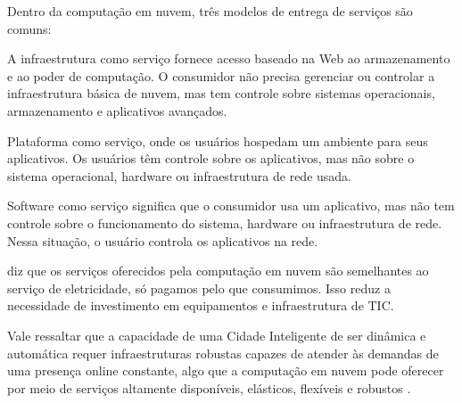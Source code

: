 Dentro da computação em nuvem, três modelos de entrega de serviços são comuns:

A infraestrutura como serviço fornece acesso baseado na Web ao armazenamento e ao poder de computação. O consumidor não precisa gerenciar ou controlar a infraestrutura básica de nuvem, mas tem controle sobre sistemas operacionais, armazenamento e aplicativos avançados.

Plataforma como serviço, onde os usuários hospedam um ambiente para seus aplicativos. Os usuários têm controle sobre os aplicativos, mas não sobre o sistema operacional, hardware ou infraestrutura de rede usada.

Software como serviço significa que o consumidor usa um aplicativo, mas não tem controle sobre o funcionamento do sistema, hardware ou infraestrutura de rede. Nessa situação, o usuário controla os aplicativos na rede.

 diz que os serviços oferecidos pela computação em nuvem são semelhantes ao serviço de eletricidade, só pagamos pelo que consumimos. Isso reduz a necessidade de investimento em equipamentos e infraestrutura de TIC.


Vale ressaltar que a capacidade de uma Cidade Inteligente de ser dinâmica e automática requer infraestruturas robustas capazes de atender às demandas de uma presença online constante, algo que a computação em nuvem pode oferecer por meio de serviços altamente disponíveis, elásticos, flexíveis e robustos \cite{kon-cloud}.

